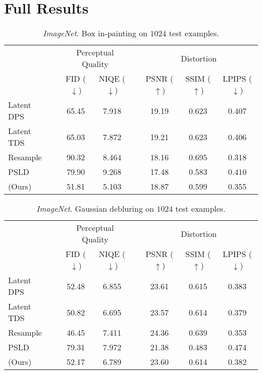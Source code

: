 \section{Full Results}
\label{sec:full_results}

\begin{table*}[!h]
\centering
\caption{\textit{ImageNet}. Box in-painting on $1024$ test examples.}
\begin{tabular}{l c cc c ccc}
    \toprule
    && \multicolumn{2}{c}{Perceptual Quality} && \multicolumn{3}{c}{Distortion}\\
    \cmidrule(l){3-4}  \cmidrule(l){6-8}
    && FID ($\downarrow$) & NIQE ($\downarrow$) && PSNR ($\uparrow$) & SSIM ($\uparrow$) & LPIPS ($\downarrow$) \\
    \midrule
    Latent DPS && 65.45 & 7.918 && 19.19 & 0.623 & 0.407\\
    Latent TDS && 65.03 & 7.872 && 19.21 & 0.623 & 0.406\\
    Resample && 90.32 & 8.464 && 18.16 & 0.695 & 0.318\\
    PSLD && 79.90 & 9.268 && 17.48 & 0.583 & 0.410\\ 
    \midrule
    \MN{} (Ours) && 51.81 & 5.103 && 18.87 & 0.599 & 0.355\\
    \bottomrule
    \end{tabular}
\label{tab:ib_imagenet}
\end{table*}


\begin{table*}[!h]
\centering
\caption{\textit{ImageNet}. Gaussian debluring on $1024$ test examples.}
\begin{tabular}{l c cc c ccc}
    \toprule
    && \multicolumn{2}{c}{Perceptual Quality} && \multicolumn{3}{c}{Distortion}\\
    \cmidrule(l){3-4}  \cmidrule(l){6-8}
    && FID ($\downarrow$) & NIQE ($\downarrow$) && PSNR ($\uparrow$) & SSIM ($\uparrow$) & LPIPS ($\downarrow$) \\
    \midrule
    Latent DPS && 52.48 & 6.855 && 23.61 & 0.615 & 0.383\\
    Latent TDS && 50.82 & 6.695 && 23.57 & 0.614 & 0.379\\
    Resample && 46.45 & 7.411 && 24.36 & 0.639 & 0.353\\
    PSLD && 79.31 & 7.972 && 21.38 & 0.483 & 0.474\\ 
    \midrule
    \MN{} (Ours) && 52.17 & 6.789 && 23.60 & 0.614 & 0.382\\ 
    \bottomrule
    \end{tabular}
\label{tab:gd_imagenet}
\end{table*}


